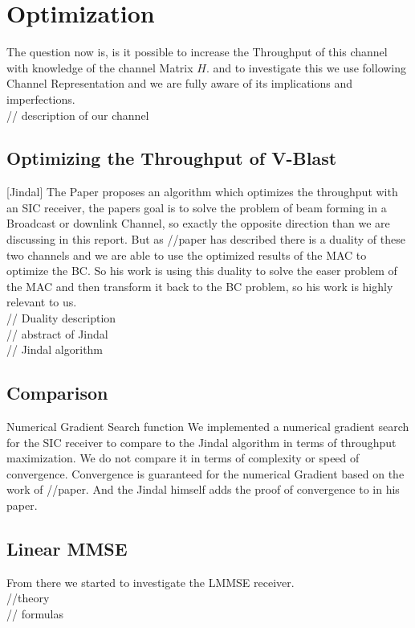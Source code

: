 ﻿\chapter{Optimization}

The question now is, is it possible to increase the Throughput of this channel with knowledge of the channel Matrix $H$. and to investigate this we use following Channel Representation and we are fully aware of its implications and imperfections.
\\// description of our channel








\section{Optimizing the Throughput of V-Blast}
[Jindal]
The Paper proposes an algorithm which optimizes the throughput with an SIC receiver, the papers goal is to solve the problem of beam forming in a Broadcast or downlink Channel, so exactly the opposite direction than we are discussing in this report. But as //paper has described there is a duality of these two channels and we are able to use the optimized results of the MAC to optimize the BC. So his work is using this duality to solve the easer problem of the MAC and then transform it back to the BC problem, so his work is highly relevant to us.\\
// Duality description\\
// abstract of Jindal\\
// Jindal algorithm

\section{Comparison}
Numerical Gradient Search function
We implemented a numerical gradient search for the SIC receiver to compare to the Jindal algorithm in terms of throughput maximization. We do not compare it in terms of complexity or speed of convergence.
Convergence is guaranteed for the numerical Gradient based on the work of //paper. And the Jindal himself adds the proof of convergence to in his paper.
\section{Linear MMSE}
From there we started to investigate the LMMSE receiver.\\
//theory\\
// formulas\\
